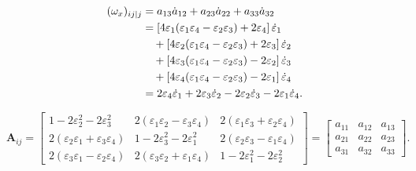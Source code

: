 \begin{align}
    (\omega_x)_{ij|j} &= a_{13}\dot{a}_{12} + a_{23}\dot{a}_{22} + a_{33}\dot{a}_{32}\notag\\
    &= \left[4\varepsilon_1(\varepsilon_1\varepsilon_4 - \varepsilon_2\varepsilon_3) + 2\varepsilon_4\right]\dot{\varepsilon}_1\notag\\
    &\quad + \left[4\varepsilon_2(\varepsilon_1\varepsilon_4 - \varepsilon_2\varepsilon_3) + 2\varepsilon_3\right]\dot{\varepsilon}_2\notag\\
    &\quad + \left[4\varepsilon_3(\varepsilon_1\varepsilon_4 - \varepsilon_2\varepsilon_3) - 2\varepsilon_2\right]\dot{\varepsilon}_3\notag\\
    &\quad + \left[4\varepsilon_4(\varepsilon_1\varepsilon_4 - \varepsilon_2\varepsilon_3) - 2\varepsilon_1\right]\dot{\varepsilon}_4\notag\\
    &= 2\varepsilon_4\dot{\varepsilon}_1 + 2\varepsilon_3\dot{\varepsilon}_2 - 2\varepsilon_2\dot{\varepsilon}_3 - 2\varepsilon_1\dot{\varepsilon}_4.
\end{align}

\begin{equation}
    \bm{A}_{ij} = \begin{bmatrix}
        1-2\varepsilon_2^2-2\varepsilon_3^2 & 2(\varepsilon_1\varepsilon_2-\varepsilon_3\varepsilon_4) & 2(\varepsilon_1\varepsilon_3+\varepsilon_2\varepsilon_4)\\
        2(\varepsilon_2\varepsilon_1+\varepsilon_3\varepsilon_4) & 1-2\varepsilon_3^2-2\varepsilon_1^2 & 2(\varepsilon_2\varepsilon_3-\varepsilon_1\varepsilon_4)\\
        2(\varepsilon_3\varepsilon_1-\varepsilon_2\varepsilon_4) & 2(\varepsilon_3\varepsilon_2+\varepsilon_1\varepsilon_4) & 1-2\varepsilon_1^2-2\varepsilon_2^2
    \end{bmatrix}
    = \begin{bmatrix}
        a_{11} & a_{12} & a_{13}\\
        a_{21} & a_{22} & a_{23}\\
        a_{31} & a_{32} & a_{33}
    \end{bmatrix}.
\end{equation}


